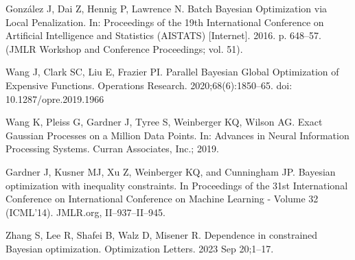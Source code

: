 \documentclass{IOS-Book-Article}
\begin{document}
\begin{thebibliography}{99}
		González J, Dai Z, Hennig P, Lawrence N. Batch Bayesian Optimization via Local Penalization. In: Proceedings of the 19th International Conference on Artificial Intelligence and Statistics (AISTATS) [Internet]. 2016. p. 648–57. (JMLR Workshop and Conference Proceedings; vol. 51).
		
		
		Wang J, Clark SC, Liu E, Frazier PI. Parallel Bayesian Global Optimization of Expensive Functions. Operations Research. 2020;68(6):1850–65. doi: 10.1287/opre.2019.1966
		
		Wang K, Pleiss G, Gardner J, Tyree S, Weinberger KQ, Wilson AG. Exact Gaussian Processes on a Million Data Points. In: Advances in Neural Information Processing Systems. Curran Associates, Inc.; 2019.
		
		Gardner J, Kusner MJ, Xu Z, Weinberger KQ, and Cunningham JP. Bayesian optimization with inequality constraints. In Proceedings of the 31st International Conference on International Conference on Machine Learning - Volume 32 (ICML'14). JMLR.org, II–937–II–945.
		
		Zhang S, Lee R, Shafei B, Walz D, Misener R. Dependence in constrained Bayesian optimization. Optimization Letters. 2023 Sep 20;1–17. 
		
		
	\end{thebibliography}
	
\end{document}
